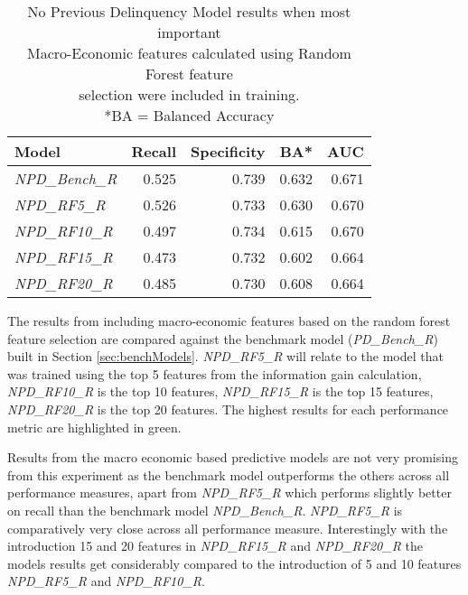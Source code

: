\begin{table}[H]
\centering
\small
		\begin{tabular}{l  r r r r}
\hline
\textbf{Model}  & \textbf{Recall} & \textbf{Specificity} & \textbf{BA*} & \textbf{AUC}  \\ \hline
\textit{NPD\_Bench\_R} & 0.525 & \cellcolor{green!25}0.739 & \cellcolor{green!25}0.632 & \cellcolor{green!25}0.671   \\ \hline
\textit{NPD\_RF5\_R}  & \cellcolor{green!25}0.526 & 0.733 & 0.630 & 0.670   \\ 
\textit{NPD\_RF10\_R} & 0.497 & 0.734 & 0.615 & 0.670 \\ 
\textit{NPD\_RF15\_R} & 0.473 & 0.732 & 0.602 & 0.664  \\
\textit{NPD\_RF20\_R} & 0.485 & 0.730 & 0.608 & 0.664  \\\hline 
		\end{tabular}

	\caption{No Previous Delinquency Model results when most important\\
		Macro-Economic features calculated using Random Forest feature \\selection were included in training.
		\\ *BA = Balanced Accuracy}
	\label{table:RFNPDModelResults}
\end{table}

The results from including macro-economic features based on the random forest feature selection are compared against the benchmark model (\textit{PD\_Bench\_R}) built in Section \ref{sec:benchModels}. \textit{NPD\_RF5\_R} will relate to the model that was trained using the top 5 features from the information gain calculation, \textit{NPD\_RF10\_R} is the top 10 features, \textit{NPD\_RF15\_R} is the top 15 features, \textit{NPD\_RF20\_R} is the top 20 features. The highest results for each performance metric are highlighted in green.

Results from the macro economic based predictive models are not very promising from this experiment as the benchmark model outperforms the others across all performance measures, apart from \textit{NPD\_RF5\_R} which performs slightly better on recall than the benchmark model \textit{NPD\_Bench\_R}. \textit{NPD\_RF5\_R} is comparatively very close across all performance measure. Interestingly with the introduction 15 and 20 features in \textit{NPD\_RF15\_R} and \textit{NPD\_RF20\_R} the models results get considerably compared to the introduction of 5 and 10 features \textit{NPD\_RF5\_R} and \textit{NPD\_RF10\_R}.



